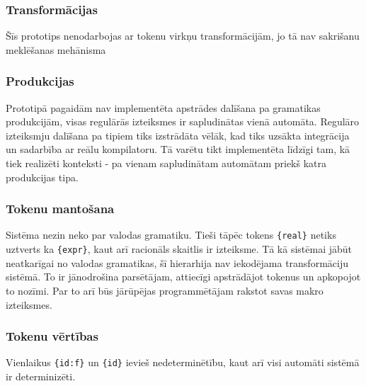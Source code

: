 \subsubsection{Transformācijas}
Šīs prototips nenodarbojas ar tokenu virkņu transformācijām, jo tā nav sakrišanu meklēšanas mehānisma 

\subsubsection{Produkcijas}
Prototipā pagaidām nav implementēta apstrādes dalīšana pa gramatikas produkcijām, visas regulārās izteiksmes ir sapludinātas vienā automāta. Regulāro izteiksmju dalīšana pa tipiem tiks izstrādāta vēlāk, kad tiks uzsākta integrācija un sadarbība ar reālu kompilatoru. Tā varētu tikt implementēta līdzīgi tam, kā tiek realizēti konteksti - pa vienam sapludinātam automātam priekš katra produkcijas tipa.

\subsubsection{Tokenu mantošana}
Sistēma nezin neko par valodas gramatiku. Tieši tāpēc tokens \verb|{real}| netiks uztverts ka \verb|{expr}|, kaut arī racionāls skaitlis ir izteiksme. Tā kā sistēmai jābūt neatkarīgai no valodas gramatikas, šī hierarhija nav iekodējama transformāciju sistēmā. To ir jānodrošina parsētājam, attiecīgi apstrādājot tokenus un apkopojot to nozīmi. Par to arī būs jārūpējas programmētājam rakstot savas makro izteiksmes.

\subsubsection{Tokenu vērtības}
 Vienlaikus \verb|{id:f}| un \verb|{id}| ievieš nedeterminētību, kaut arī visi automāti sistēmā ir determinizēti.
